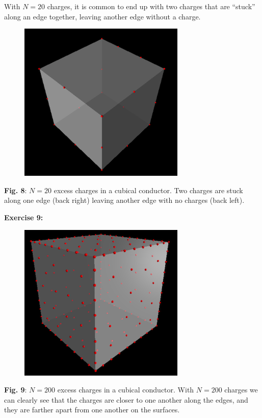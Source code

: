 \documentclass[]{article}
\begin{document}
With \(N=20\) charges, it is common to end up with two charges that are
``stuck'' along an edge together, leaving another edge without a charge.

\begin{figure}[htbp]
\centering
\includegraphics{images/cube_20_edge.png}
\caption{}
\end{figure}

\textbf{Fig. 8}: \(N = 20\) excess charges in a cubical conductor. Two
charges are stuck along one edge (back right) leaving another edge with
no charges (back left).

\textbf{Exercise 9:}

\begin{figure}[htbp]
\centering
\includegraphics{images/cube_200.png}
\caption{}
\end{figure}

\textbf{Fig. 9}: \(N = 200\) excess charges in a cubical conductor. With
\(N = 200\) charges we can clearly see that the charges are closer to
one another along the edges, and they are farther apart from one another
on the surfaces.
\end{document}
